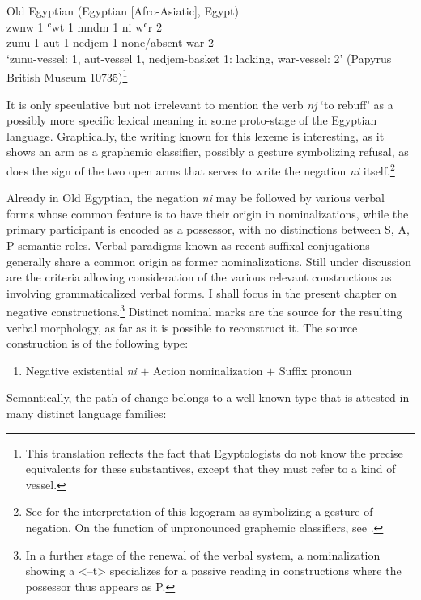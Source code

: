 \documentclass[output=paper]{langsci/langscibook}
\newcommand{\ꜥ}{ʿ}
\newcommand{\ꜣ}{\kern-.25pt\texttt{ꜣ}\kern-.6pt}
\begin{document}
\ea Old Egyptian (Egyptian [Afro-Asiatic], Egypt) \label{ex:AE3}\\
	\gll zwnw 1 {\ꜥ}wt 1 mndm 1 ni w{\ꜥ}r 2\\
	zunu 1 aut 1 nedjem 1 none/absent war 2\\
	\glt ‘zunu-vessel: 1, aut-vessel 1, nedjem-basket 1: lacking, war-vessel: 2’ (Papyrus	British Museum 10735)\footnote{This translation reflects the fact that Egyptologists do not know the precise equivalents for these substantives, except that they must refer to a kind of vessel.}
\z 

It is only speculative but not irrelevant to mention the verb \textit{nj} ‘to rebuff’ as a possibly more specific lexical meaning in some proto-stage of the Egyptian language. Graphically, the writing known for this lexeme is interesting, as it shows an arm as a graphemic classifier, possibly a gesture symbolizing refusal, as does the sign of the two open arms that serves to write the negation \textit{ni} itself.\footnote{See \citet[125]{Loprieno1995} for the interpretation of this logogram as symbolizing a gesture of negation. On the function of unpronounced graphemic classifiers, see \citet{GoldwasserGrinevald2012}.}

Already in Old Egyptian, the negation \textit{ni} may be followed by various verbal forms whose common feature is to have their origin in nominalizations, while the primary participant is encoded as a possessor, with no distinctions between S, A, P semantic roles. Verbal paradigms known as recent suffixal conjugations generally share a common origin as former nominalizations. Still under discussion are the criteria allowing consideration of the various relevant constructions as involving grammaticalized verbal forms. I shall focus in the present chapter on negative constructions.\footnote{In a further stage of the renewal of the verbal system, a nominalization showing a <–t> specializes for a passive reading in constructions where the possessor thus appears as P.} Distinct nominal marks are the source for the resulting verbal morphology, as far as it is possible to reconstruct it. The source construction is of the following type: 

\begin{enumerate}[label=(\roman*)] %
	\item Negative existential \textit{ni} $+$ Action nominalization $+$ Suffix pronoun
\end{enumerate}

Semantically, the path of change belongs to a well-known type that is attested in many distinct language families: 
\end{document}

